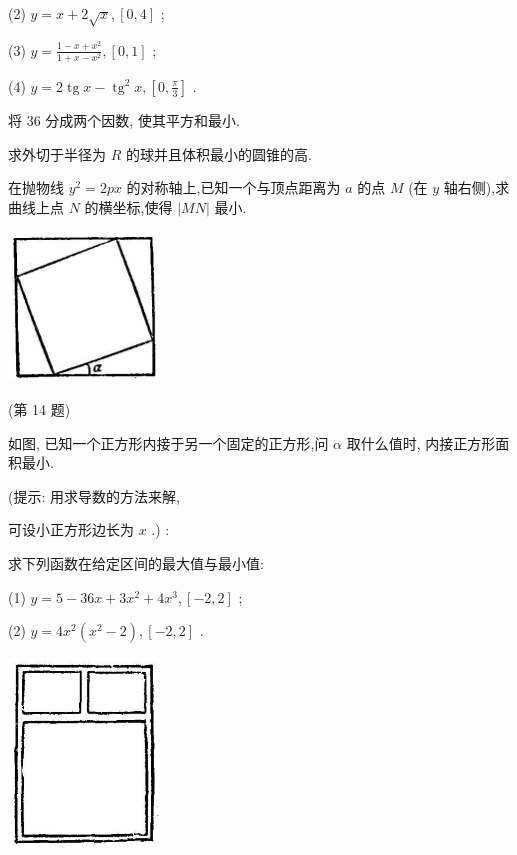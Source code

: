 \documentclass[lang=cn,newtx,10pt,scheme=chinese]{elegantbook}
\begin{document}
\begin{problemset}[习 题 十 一]
(2) \(y = x + 2\sqrt{x},\left\lbrack {0,4}\right\rbrack\) ;

(3) \(y = \frac{1 - x + {x}^{2}}{1 + x - {x}^{2}},\left\lbrack {0,1}\right\rbrack\) ;

(4) \(y = 2\operatorname{tg}x - {\operatorname{tg}}^{2}x,\left\lbrack {0,\frac{\pi }{3}}\right\rbrack\) .

\item 将 36 分成两个因数, 使其平方和最小.

\item 求外切于半径为 \(R\) 的球并且体积最小的圆锥的高.

\item 在抛物线 \({y}^{2} = {2px}\) 的对称轴上,已知一个与顶点距离为 \(a\) 的点 \(M\) (在 \(y\) 轴右侧),求曲线上点 \(N\) 的横坐标,使得 \(\left| {MN}\right|\) 最小.

\begin{center}
\includegraphics[max width=0.3\textwidth]{images/01912c18-5c3f-733d-b775-749ba9897a9d_156_776700.jpg}
\end{center}

(第 14 题)

\item 如图, 已知一个正方形内接于另一个固定的正方形,问 \(\alpha\) 取什么值时, 内接正方形面积最小.

(提示: 用求导数的方法来解,

可设小正方形边长为 \(x\) .) :

\item 求下列函数在给定区间的最大值与最小值:

(1) \(y = 5 - {36x} + 3{x}^{2} + 4{x}^{3},\left\lbrack {-2,2}\right\rbrack\) ;

(2) \(y = 4{x}^{2}\left( {{x}^{2} - 2}\right) ,\left\lbrack {-2,2}\right\rbrack\) .

\begin{center}
\includegraphics[max width=0.3\textwidth]{images/01912c18-5c3f-733d-b775-749ba9897a9d_157_303198.jpg}
\end{center}


\end{problemset}
\end{document}
